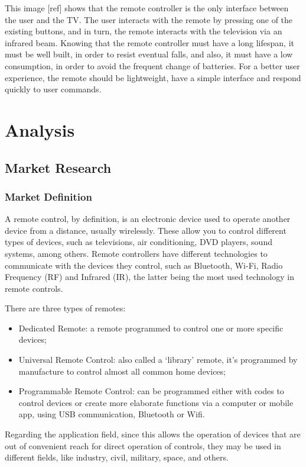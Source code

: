 \documentclass[12pt, letterpaper]{report}
\begin{document}
This image [ref] shows that the remote controller is the only interface between the user and the TV. The user interacts with the remote by pressing one of the existing buttons, and in turn, the remote interacts with the television via an infrared beam. Knowing that the remote controller must have a long lifespan, it must be well built, in order to resist eventual falls, and also, it must have a low consumption, in order to avoid the frequent change of batteries. For a better user experience, the remote should be lightweight, have a simple interface and respond quickly to user commands.

\chapter{Analysis}
\section{Market Research}
\subsection{Market Definition}
A remote control, by definition, is an electronic device used to operate another device from a distance, usually wirelessly. These allow you to control different types of devices, such as televisions, air conditioning, DVD players, sound systems, among others. Remote controllers have different technologies to communicate with the devices they control, such as Bluetooth, Wi-Fi, Radio Frequency (RF) and Infrared (IR), the latter being the most used technology in remote controls.

There are three types of remotes:

\begin{itemize}
	\item Dedicated Remote: a remote programmed to control one or more 					specific devices; 

	\item Universal Remote Control: also called a ‘library’ remote, it’s 				programmed by manufacture to control almost all common home devices;

	\item Programmable Remote Control: can be programmed either with codes 				to control devices or create more elaborate functions via a 					computer or mobile app, using USB communication, Bluetooth or Wifi.
\end{itemize}

Regarding the application field, since this allows the operation of devices that are out of convenient reach for direct operation of controls, they may be used in different fields, like industry, civil, military, space, and others.
\end{document}
